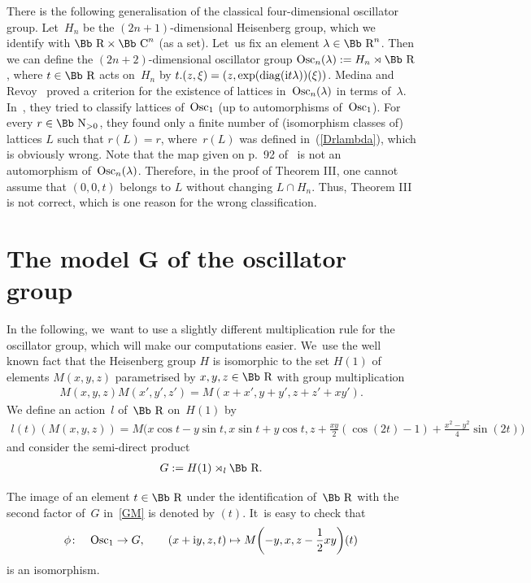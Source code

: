\documentclass[pdftex]{sigma}
\newcommand\CC{{\mbox{\Bb C}}}
\newcommand\RR{{\mbox{\Bb R}}}
\newcommand\NN{{\mbox{\Bb N}}}
\newcommand{\Osc}{{\rm Osc}}
\newcommand{\diag}{\mathop{{\rm diag}}}
\numberwithin{equation}{section}
\begin{document}
\begin{Remark}\label{RMR}
There is the following generalisation of the classical four-dimensional oscillator group. Let~$H_n$ be the $(2n+1)$-dimensional Heisenberg group, which we identify with $\RR\times \CC^n$ (as a set). Let~us fix an element $\lambda\in\RR^n$. Then we can define the $(2n+2)$-dimensional oscillator group $\Osc_n(\lambda):=H_n\rtimes\RR$, where $t\in\RR$ acts on~$H_n$ by $t.(z,\xi)=(z,\exp(\diag({\rm i}t\lambda))(\xi))$. Medina and Revoy~\cite{MR} proved a criterion for the existence of lattices in~$\Osc_n(\lambda)$ in terms of~$\lambda$. In~\cite[p.~94]{MR}, they tried to classify lattices of~$\Osc_1$ (up to automorphisms of~$\Osc_1$). For every $r\in\NN_{>0}$, they found only a finite number of (isomorphism classes of) lattices $L$ such that $r(L)=r$, where~$r(L)$ was defined in~(\ref{Drlambda}), which is obviously wrong. Note that the map given on p.~92 of~\cite{MR} is not an automorphism of~$\Osc_n(\lambda)$. Therefore, in the proof of Theorem III, one cannot assume that $(0,0,t)$ belongs to $L$ without changing $L\cap H_n$. Thus, Theorem III is not correct, which is one reason for the wrong classification.
\end{Remark}

\section[The model $G$ of the oscillator group]{The model $\boldsymbol G$ of the oscillator group}
In the following, we~want to use a slightly different multiplication rule for the oscillator group, which will make our computations easier. We~use the well known fact that the Heisenberg group $H$ is isomorphic to the set $H(1)$ of elements $M(x,y,z)$ parametrised by $x,y,z\in \RR$ with group multiplication
\begin{gather*}
M(x,y,z)M(x',y',z')=M(x+x',y+y',z+z'+xy').
\end{gather*}
We define an action~${l}$ of~$\RR$ on~$H(1)$ by
\begin{gather*}
l(t)(M(x,y,z))=M\bigg(x \cos t\! -y \sin t, x \sin t\! + y\cos t, z \!+ \frac {xy}2 (\cos (2t)\! -1)\!+\frac {x^2\!-y^2}4\sin (2t)\!\bigg)
\end{gather*}
and consider the semi-direct product
\begin{gather}
G:=H(1)\rtimes_l \RR. \label{GM}
\end{gather}
{\samepage
The image of an element $t\in\RR$ under the identification of~$\RR$ with the second factor of~$G$ in~\eqref{GM} is denoted by $(t)$. It~is easy to check that
\begin{gather}
\phi\colon\quad \Osc_1\rightarrow G,\qquad (x+{\rm i}y,z,t)\mapsto M\bigg({-}y,x,z-\frac12 xy\bigg)(t)\label{Eiso}
\end{gather}
is an isomorphism.

}
\end{document}
